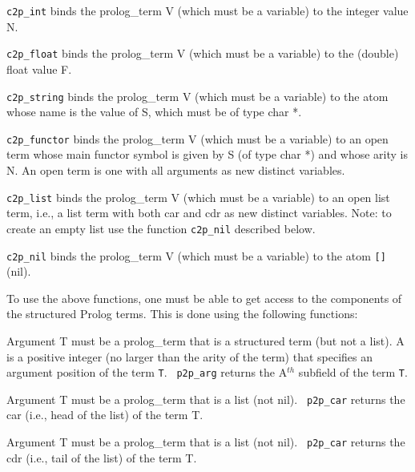 \begin{description}
 
    {\tt c2p\_int} binds the prolog\_term V (which must be a variable)
    to the integer value N.

 
    {\tt c2p\_float} binds the prolog\_term V (which must be a variable)
    to the (double) float value F.

 
    {\tt c2p\_string} binds the prolog\_term V (which must be a
    variable) to the atom whose name is the value of S, which must be
    of type char *.

 
    {\tt c2p\_functor} binds the prolog\_term V (which must be a
    variable) to an open term whose main functor symbol is given by S
    (of type char *) and whose arity is N.  An open term is one with
    all arguments as new distinct variables.

 
    {\tt c2p\_list} binds the prolog\_term V (which must be a variable)
    to an open list term, i.e., a list term with both car and cdr as
    new distinct variables. Note: to create an empty list use the function
    {\tt c2p\_nil} described below.

 
    {\tt c2p\_nil} binds the prolog\_term V (which must be a
    variable) to the atom \verb|[]| (nil).
\end{description}


To use the above functions, one must be able to get access to the
components of the structured Prolog terms.
This is done using the following functions:

\begin{description}
 
    Argument T must be a prolog\_term that is a structured term (but
    not a list).  A is a positive integer (no larger than the arity of
    the term) that specifies an argument position of the term {\tt T}.  {\tt
    p2p\_arg} returns the A$^{th}$ subfield of the term {\tt T}.

 
    Argument T must be a prolog\_term that is a list (not nil).  {\tt
    p2p\_car} returns the car (i.e., head of the list) of the
    term T.

 
    Argument T must be a prolog\_term that is a list (not nil).  {\tt
    p2p\_car} returns the cdr (i.e., tail of the list) of the
    term T.
\end{description}

